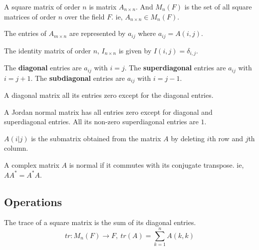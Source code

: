 \begin{definition}[square]
	A square matrix of order $n$ is matrix $A_{n \times n}$.
	And $M_n(F)$ is the set of all square matrices of order $n$ over the field $F$. ie, $A_{n \times n} \in M_n(F)$.
\end{definition}

\begin{note}
	The entries of $A_{m \times n}$ are represented by $a_{ij}$ where $a_{ij} = A(i,j)$.
\end{note}

\begin{definition}[identity]
	The identity matrix of order $n$, $I_{n \times n}$ is given by $I(i,j) = \delta_{i,j}$.
\end{definition}

\begin{definition}[diagonals]
	The \textbf{diagonal} entries are $a_{ij}$ with $i=j$.
	The \textbf{superdiagonal} entries are $a_{ij}$ with $i=j+1$.
	The \textbf{subdiagonal} entries are $a_{ij}$ with $i=j-1$.
\end{definition}

\begin{definition}[diagonal]
	A diagonal matrix all its entries zero except for the diagonal entries.
\end{definition}

\begin{definition}
	A Jordan normal matrix has all entries zero except for diagonal and superdiagonal entries.
	All its non-zero superdiagonal entries are $1$.
\end{definition}

\begin{definition}[submatrix]
	$A(i|j)$ is the submatrix obtained from the matrix $A$ by deleting $i$th row and $j$th column.
\end{definition}

\begin{definition}[normal]
	A complex matrix $A$ is normal if it commutes with its conjugate transpose. ie, $AA^\ast = A^\ast A$.
\end{definition}

\subsection{Operations}
\begin{definition}[trace]
	The trace of a square matrix is the sum of its diagonal entries.
	\begin{equation}
		tr : M_n(F) \to F,\ tr(A) = \sum_{k=1}^n A(k,k)
	\end{equation}
\end{definition}

